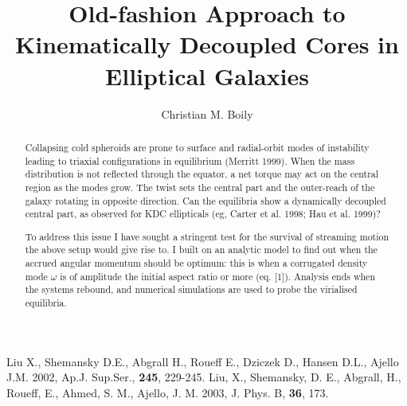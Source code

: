 {{{{{{{{{{{{{{\begin{references}
Liu X., Shemansky D.E., Abgrall H., Roueff E., Dziczek D., Hansen D.L., Ajello J.M. 2002, Ap.J. Sup.Ser., \textbf{245},
229-245.
Liu, X., Shemansky, D. E., Abgrall, H., Roueff, E., Ahmed, S. M., Ajello, J. M. 2003, J. Phys. B, \textbf{36},
173.




\title{Old-fashion Approach to Kinematically Decoupled Cores in
Elliptical Galaxies}
\author{Christian M. Boily}

\begin{abstract}

Collapsing cold spheroids are prone to surface and radial-orbit modes
of instability leading to triaxial configurations in equilibrium
(Merritt 1999). When the mass distribution is not reflected through
the equator, a net torque may act on the central region as the modes
grow. The twist sets the central part and the outer-reach of the
galaxy rotating in opposite direction.
 Can the equilibria show a dynamically decoupled central part,
 as observed for KDC ellipticals (eg, Carter et al. 1998; Hau et
al. 1999)?

To address this issue I have sought a stringent test for the
survival of streaming motion the above setup would give rise to.
 I built on an analytic model to find out when the accrued angular
momentum should be optimum: this is when a corrugated density mode
$\omega$ is of amplitude the initial aspect ratio or more
(eq. [1]). Analysis ends when the systems rebound, and numerical
simulations are used to probe the virialised equilibria.

\end{abstract}



\end{references}}}}}}}}}}}}}}}

